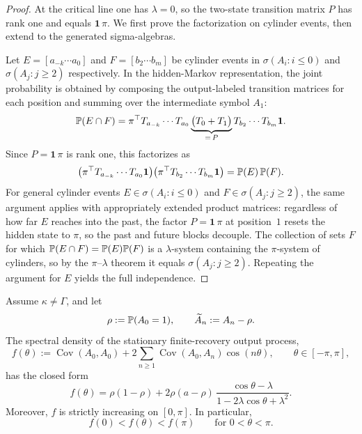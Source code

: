 \begin{proof}
At the critical line one has $\lambda=0$, so the two-state transition matrix $P$ has rank one and equals $\mathbf 1\,\pi$. We first prove the factorization on cylinder events, then extend to the generated sigma-algebras.

Let $E=[a_{-k}\cdots a_0]$ and $F=[b_2\cdots b_m]$ be cylinder events in $\sigma(A_i:i\le 0)$ and $\sigma(A_j:j\ge 2)$ respectively. In the hidden-Markov representation, the joint probability is obtained by composing the output-labeled transition matrices for each position and summing over the intermediate symbol $A_1$:
\[
\mathbb{P}(E\cap F)
=
\pi^\top T_{a_{-k}}\cdots T_{a_0}
\underbrace{\bigl(T_0+T_1\bigr)}_{=\,P}
T_{b_2}\cdots T_{b_m}\mathbf 1.
\]
Since $P=\mathbf 1\,\pi$ is rank one, this factorizes as
\[
\bigl(\pi^\top T_{a_{-k}}\cdots T_{a_0}\mathbf 1\bigr)
\bigl(\pi^\top T_{b_2}\cdots T_{b_m}\mathbf 1\bigr)
=
\mathbb{P}(E)\,\mathbb{P}(F).
\]
For general cylinder events $E\in\sigma(A_i:i\le 0)$ and $F\in\sigma(A_j:j\ge 2)$, the same argument applies with appropriately extended product matrices: regardless of how far $E$ reaches into the past, the factor $P=\mathbf 1\,\pi$ at position~$1$ resets the hidden state to $\pi$, so the past and future blocks decouple. The collection of sets $F$ for which $\mathbb{P}(E\cap F)=\mathbb{P}(E)\mathbb{P}(F)$ is a $\lambda$-system containing the $\pi$-system of cylinders, so by the $\pi$--$\lambda$ theorem \cite{Billingsley1995} it equals $\sigma(A_j:j\ge 2)$. Repeating the argument for $E$ yields the full independence.
\end{proof}

\begin{theorem}\label{thm:finite-recovery-spectrum}
Assume $\kappa\neq\Gamma$, and let
\[
\rho:=\mathbb{P}(A_0=1),
\qquad
\widetilde A_n:=A_n-\rho.
\]
The spectral density of the stationary finite-recovery output process,
\[
f(\theta)
:=
\operatorname{Cov}(A_0,A_0)
+
2\sum_{n\ge 1}\operatorname{Cov}(A_0,A_n)\cos(n\theta),
\qquad
\theta\in[-\pi,\pi],
\]
has the closed form
\begin{equation}\label{eq:finite-recovery-spectrum}
f(\theta)
=
\rho(1-\rho)
+
2\rho(a-\rho)\,
\frac{\cos\theta-\lambda}{1-2\lambda\cos\theta+\lambda^2}.
\end{equation}
Moreover, $f$ is strictly increasing on $[0,\pi]$. In particular,
\[
f(0)<f(\theta)<f(\pi)
\qquad\text{for }0<\theta<\pi.
\]
\end{theorem}


